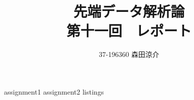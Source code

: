 \documentclass[dvipdfmx, fleqn, titlepage]{jsarticle}
\title{
	先端データ解析論 \\
	第十一回　レポート
	}
\author{37-196360 \quad 森田涼介}
\begin{document}
\maketitle

{assignment1}
{assignment2}
\newpage
{listings}
\end{document}
